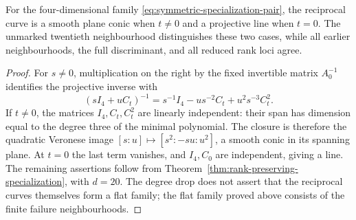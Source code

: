 \begin{corollary}
\label{cor:reciprocal-conic-line}
For the four-dimensional family \eqref{eq:symmetric-specialization-pair},
the reciprocal curve is a smooth plane conic when \(t\ne0\)
and a projective line when \(t=0\).  The unmarked twentieth
neighbourhood distinguishes these two cases, while all earlier
neighbourhoods, the full discriminant, and all reduced rank loci agree.
\end{corollary}
\begin{proof}
For \(s\ne0\), multiplication on the right by the fixed
invertible matrix \(A_0^{-1}\) identifies the projective inverse
with
\[
 (sI_4+uC_t)^{-1}
   =s^{-1}I_4-us^{-2}C_t+u^2s^{-3}C_t^2.
\]
If \(t\ne0\), the matrices \(I_4,C_t,C_t^2\) are
linearly independent: their span has dimension equal to the degree
three of the minimal polynomial.  The closure is therefore the
quadratic Veronese image \([s:u]\mapsto[s^2:-su:u^2]\),
a smooth conic in its spanning plane.  At \(t=0\) the last term
vanishes, and \(I_4,C_0\) are independent, giving a line.
The remaining assertions follow from
Theorem~\ref{thm:rank-preserving-specialization}, with \(d=20\).
The degree drop does not assert that the reciprocal curves themselves
form a flat family; the flat family proved above consists of the
finite failure neighbourhoods.
\end{proof}
